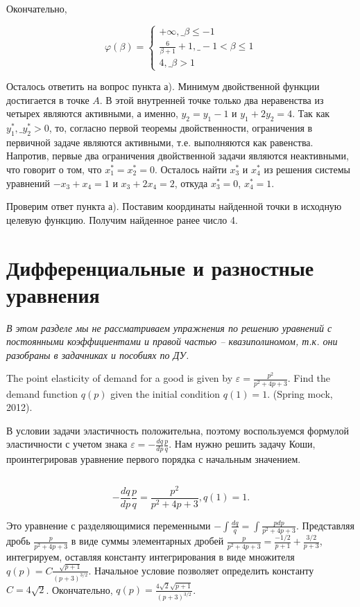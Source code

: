 \begin{solution}
Окончательно,  

\[\varphi (\beta )=\left\{\begin{array}{l} {+\infty ,\_ \beta \le -1} \\ {\frac{6}{\beta +1} +1,\_ -1<\beta \le 1} \\ {4,\_ \beta >1} \end{array}\right. \] 

Осталось ответить на вопрос пункта а). Минимум двойственной функции достигается в точке $A$. В этой внутренней точке только два неравенства из четырех являются активными, а именно, $y_{2} =y_{1} -1$ и $y_{1} +2y_{2} =4$. Так как $y_{1}^{*} ,\_ y_{2}^{*} >0$, то, согласно первой теоремы двойственности, ограничения в первичной задаче являются активными, т.е. выполняются как равенства. Напротив, первые два ограничения двойственной задачи являются неактивными, что говорит о том, что $x_{1}^{*} =x_{2}^{*} =0$. Осталось найти $x_{3}^{*} $ и $x_{4}^{*} $ из решения системы уравнений $-x_{3} +x_{4} =1$ и $x_{3} +2x_{4} =2$, откуда $x_{3}^{*} =0$, $x_{4}^{*} =1$.

Проверим ответ пункта а). Поставим координаты найденной точки в исходную целевую функцию. Получим найденное ранее число 4.
\end{solution}




\section{Дифференциальные и разностные уравнения}

\textit{В этом разделе мы не рассматриваем упражнения по решению уравнений с постоянными коэффициентами и правой частью -- квазиполиномом, т.к. они разобраны в задачниках и пособиях по ДУ.}

\begin{problem}
The point elasticity of demand for a good is given by $\varepsilon =\frac{p^{2} }{p^{2} +4p+3} $. Find the demand function $q(p)$ given the initial condition $q(1)=1$. (Spring mock, 2012).
\end{problem}


\begin{solution}
В условии задачи эластичность положительна, поэтому воспользуемся формулой эластичности с учетом знака $\varepsilon =-\frac{dq}{dp} \frac{p}{q} $. Нам нужно решить задачу Коши, проинтегрировав уравнение первого порядка с начальным значением.

$ $

\[-\frac{dq}{dp} \frac{p}{q} =\frac{p^{2} }{p^{2} +4p+3} , q(1)=1.\] 

Это уравнение с разделяющимися переменными $-\int \frac{dq}{q} =\int \frac{pdp}{p^{2} +4p+3}   $. Представляя дробь $\frac{p}{p^{2} +4p+3} $ в виде суммы элементарных дробей $\frac{p}{p^{2} +4p+3} =\frac{-1/2}{p+1} +\frac{3/2}{p+3} $, интегрируем, оставляя константу интегрирования в виде множителя $q(p)=C\frac{\sqrt{p+1} }{(p+3)^{3/2} } $. Начальное условие позволяет определить константу $C=4\sqrt{2} $. Окончательно, $q(p)=\frac{4\sqrt{2} \sqrt{p+1} }{(p+3)^{3/2} } $.
\end{solution}

